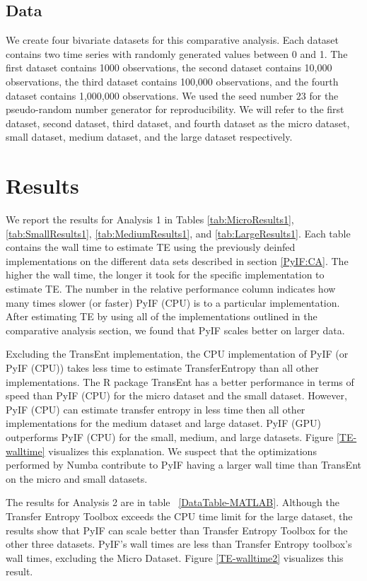 \subsection{Data}

We create four bivariate datasets for this comparative analysis. Each dataset contains two time series with randomly generated values between 0 and 1. The first dataset contains 1000 observations, the second dataset contains 10,000 observations, the third dataset contains 100,000 observations, and the fourth dataset contains 1,000,000 observations.  We used the seed number  \(23\) for the pseudo-random number generator for reproducibility. We will refer to the first dataset, second dataset, third dataset, and fourth dataset as the micro dataset, small dataset, medium dataset, and the large dataset respectively.

\section{Results}

We report the results for Analysis 1 in Tables \ref{tab:MicroResults1},  \ref{tab:SmallResults1}, \ref{tab:MediumResults1}, and \ref{tab:LargeResults1}.  Each table contains the wall time to estimate TE using the previously deinfed implementations on the different data sets described in section \ref{PyIF:CA}.  The higher the wall time, the longer it took for the specific implementation to estimate TE.  The number in the relative performance column indicates how many times slower (or faster) PyIF (CPU) is to a particular implementation.  After estimating TE by using all of the implementations outlined in the comparative analysis section, we found that PyIF scales better on larger data.  

Excluding the TransEnt implementation, the CPU implementation of PyIF (or PyIF (CPU)) takes less time to estimate TransferEntropy than all other implementations. The R package TransEnt has a better performance in terms of speed than PyIF (CPU) for the micro dataset and the small dataset. However, PyIF (CPU) can estimate transfer entropy in less time then all other implementations for the medium dataset and large dataset. PyIF (GPU) outperforms PyIF (CPU) for the small, medium, and large datasets. Figure \ref{TE-walltime} visualizes this explanation. We suspect that the optimizations performed by Numba contribute to PyIF having a larger wall time than TransEnt on the micro and small datasets.

The results for Analysis 2 are in table ~\ref{DataTable-MATLAB}.  Although the Transfer Entropy Toolbox exceeds the CPU time limit for the large dataset, the results show that PyIF can scale better than Transfer Entropy Toolbox for the other three datasets. PyIF's wall times are less than Transfer Entropy toolbox's wall times, excluding the Micro Dataset.  Figure \ref{TE-walltime2} visualizes this result.


